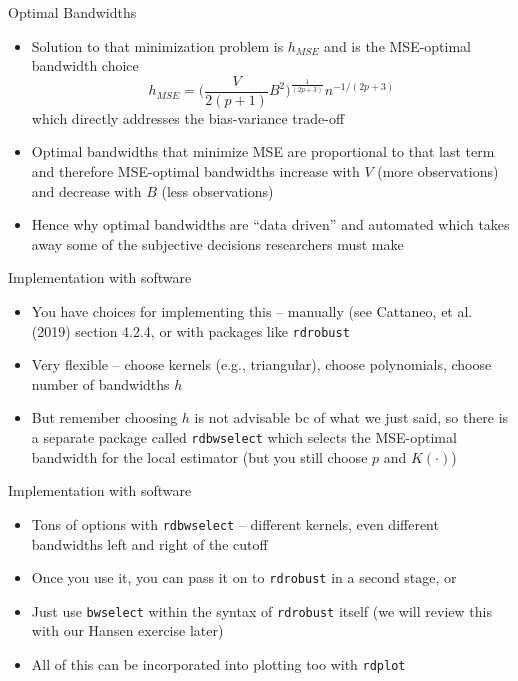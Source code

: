 \documentclass{beamer}
\begin{document}
\begin{frame}{Optimal Bandwidths}

\begin{itemize}
\item Solution to that minimization problem is $h_{MSE}$ and is the MSE-optimal bandwidth choice$$h_{MSE} = \bigg ( \frac{V}{2(p+1)}B^2 \bigg )^{\frac{1}{(2p+3)}}n^{-1/(2p+3)}$$which directly addresses the bias-variance trade-off
\item Optimal bandwidths that minimize MSE are proportional to that last term and therefore MSE-optimal bandwidths increase with $V$ (more observations) and decrease with $B$ (less observations)
\item Hence why optimal bandwidths are ``data driven'' and automated which takes away some of the subjective decisions researchers must make
\end{itemize}

\end{frame}


\begin{frame}{Implementation with software}

\begin{itemize}
\item You have choices for implementing this -- manually (see Cattaneo, et al. (2019) section 4.2.4, or with packages like \texttt{rdrobust} 
\item Very flexible -- choose kernels (e.g., triangular), choose polynomials, choose number of bandwidths $h$
\item But remember choosing $h$ is not advisable bc of what we just said, so there is a separate package called \texttt{rdbwselect} which selects the MSE-optimal bandwidth for the local estimator (but you still choose $p$ and $K(\cdot)$)
\end{itemize}

\end{frame}

\begin{frame}{Implementation with software}

\begin{itemize}
\item Tons of options with \texttt{rdbwselect} -- different kernels, even different bandwidths left and right of the cutoff
\item Once you use it, you can pass it on to \texttt{rdrobust} in a second stage, or
\item Just use \texttt{bwselect} within the syntax of \texttt{rdrobust} itself (we will review this with our Hansen exercise later)
\item All of this can be incorporated into plotting too with \texttt{rdplot}
\end{itemize}

\end{frame}
\end{document}
